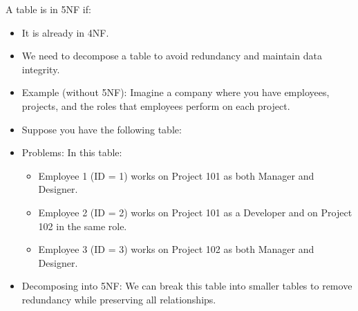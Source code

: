 \setlength{\columnsep}{3pt}
\begin{flushleft}
	
	A table is in 5NF if:
	
	\begin{itemize}
		\item It is already in 4NF.
		
		\item We need to decompose a table to avoid redundancy and maintain data integrity.
		
		\item Example (without 5NF): Imagine a company where you have employees, projects, and the roles that employees perform on each project. 
		
		\item Suppose you have the following table:
		
		
		\item Problems: In this table:
		
		\begin{itemize}
			\item Employee 1 (ID = 1) works on Project 101 as both Manager and Designer.
			\item Employee 2 (ID = 2) works on Project 101 as a Developer and on Project 102 in the same role.
			\item Employee 3 (ID = 3) works on Project 102 as both Manager and Designer.
		\end{itemize}
		
		\item Decomposing into 5NF: We can break this table into smaller tables to remove redundancy while preserving all relationships. 
		
		\newpage
		
	\end{itemize}	

	

	
\end{flushleft}

\newpage